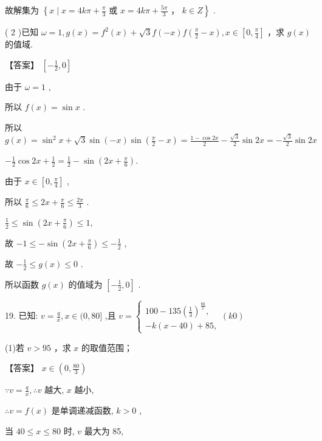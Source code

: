\documentclass[10pt]{article}
\begin{document}
故解集为 \(\left\{  {x \mid  x = {4k\pi } + \frac{\pi }{3}}\right.\) 或 \(\left. {x = {4k\pi } + \frac{5\pi }{3}\text{ ， }k \in  Z}\right\}\) .

( 2 )已知 \(\omega  = 1,g\left( x\right)  = {f}^{2}\left( x\right)  + \sqrt{3}f\left( {-x}\right) f\left( {\frac{\pi }{2} - x}\right) ,x \in  \left\lbrack  {0,\frac{\pi }{4}}\right\rbrack\) ，求 \(g\left( x\right)\) 的值域.

【答案】 \(\left\lbrack  {-\frac{1}{2},0}\right\rbrack\)

由于 \(\omega  = 1\) ,

所以 \(f\left( x\right)  = \sin x\) .

所以 \(g\left( x\right)  = {\sin }^{2}x + \sqrt{3}\sin \left( {-x}\right) \sin \left( {\frac{\pi }{2} - x}\right)  = \frac{1 - \cos {2x}}{2} - \frac{\sqrt{3}}{2}\sin {2x} =  - \frac{\sqrt{3}}{2}\sin {2x}\)

\(- \frac{1}{2}\cos {2x} + \frac{1}{2} = \frac{1}{2} - \sin \left( {{2x} + \frac{\pi }{6}}\right) .\)

由于 \(x \in  \left\lbrack  {0,\frac{\pi }{4}}\right\rbrack\) ,

所以 \(\frac{\pi }{6} \leq  {2x} + \frac{\pi }{6} \leq  \frac{2\pi }{3}\) .

\(\frac{1}{2} \leq  \sin \left( {{2x} + \frac{\pi }{6}}\right)  \leq  1,\)

故 \(- 1 \leq   - \sin \left( {{2x} + \frac{\pi }{6}}\right)  \leq   - \frac{1}{2}\) ,

故 \(- \frac{1}{2} \leq  g\left( x\right)  \leq  0\) .

所以函数 \(g\left( x\right)\) 的值域为 \(\left\lbrack  {-\frac{1}{2},0}\right\rbrack\) .

19. 已知: \(v = \frac{q}{x},x \in  (0,{80}\rbrack\) ,且 \(v = \left\{  \begin{array}{l} {100} - {135}{\left( \frac{1}{3}\right) }^{\frac{80}{x}}, \\   - k\left( {x - {40}}\right)  + {85}, \end{array}\right. \left( {k0}\right)\)

(1)若 \(v > {95}\) ，求 \(x\) 的取值范围；

【答案】 \(x \in  \left( {0,\frac{80}{3}}\right)\)

\(\because v = \frac{q}{x},\therefore v\) 越大, \(x\) 越小,

\(\therefore v = f\left( x\right)\) 是单调递减函数, \(k > 0\) ,

当 \({40} \leq  x \leq  {80}\) 时, \(v\) 最大为 85,
\end{document}
